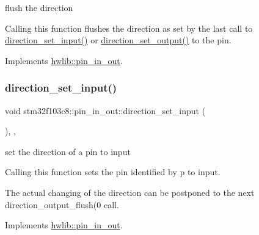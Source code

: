 flush the direction

Calling this function flushes the direction as set by the last call to \hyperlink{classstm32f103c8_1_1pin__in__out_ac76dc0765d36d13b9d24f7939af1e39f}{direction\+\_\+set\+\_\+input()} or \hyperlink{classstm32f103c8_1_1pin__in__out_ac5e1d7c630e1b25467c224110ed9de1c}{direction\+\_\+set\+\_\+output()} to the pin. 

Implements \hyperlink{classhwlib_1_1pin__in__out_a86ef2b296683d8c0133280075c82cb51}{hwlib\+::pin\+\_\+in\+\_\+out}.

\mbox{\label{classstm32f103c8_1_1pin__in__out_ac76dc0765d36d13b9d24f7939af1e39f}} 
\subsubsection{\texorpdfstring{direction\+\_\+set\+\_\+input()}{direction\_set\_input()}}
{\footnotesize\ttfamily void stm32f103c8\+::pin\+\_\+in\+\_\+out\+::direction\+\_\+set\+\_\+input (\begin{DoxyParamCaption}{ }\end{DoxyParamCaption})\hspace{0.3cm}{\ttfamily [inline]}, {\ttfamily [override]}, {\ttfamily [virtual]}}

set the direction of a pin to input

Calling this function sets the pin identified by p to input.

The actual changing of the direction can be postponed to the next direction\+\_\+output\+\_\+flush(0 call. 

Implements \hyperlink{classhwlib_1_1pin__in__out_a54ce1a5086d3c9e7b868511b1d46acd0}{hwlib\+::pin\+\_\+in\+\_\+out}.

\mbox{\label{classstm32f103c8_1_1pin__in__out_ac5e1d7c630e1b25467c224110ed9de1c}} 
